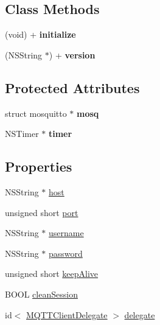 \subsection*{Class Methods}
\begin{DoxyCompactItemize}
\item 
\hypertarget{interface_m_q_t_t_client_addc8362ee9e927f944c604daf5f7e0c7}{(void) + {\bfseries initialize}}\label{interface_m_q_t_t_client_addc8362ee9e927f944c604daf5f7e0c7}

\item 
\hypertarget{interface_m_q_t_t_client_a28d3f42ae2595214b2c40794ca638c45}{(N\-S\-String $\ast$) + {\bfseries version}}\label{interface_m_q_t_t_client_a28d3f42ae2595214b2c40794ca638c45}

\end{DoxyCompactItemize}
\subsection*{Protected Attributes}
\begin{DoxyCompactItemize}
\item 
\hypertarget{interface_m_q_t_t_client_ae4f553d3d5b3f96833631fa71d089cae}{struct mosquitto $\ast$ {\bfseries mosq}}\label{interface_m_q_t_t_client_ae4f553d3d5b3f96833631fa71d089cae}

\item 
\hypertarget{interface_m_q_t_t_client_a947472d48ef128a407c579f3f03b6bb6}{N\-S\-Timer $\ast$ {\bfseries timer}}\label{interface_m_q_t_t_client_a947472d48ef128a407c579f3f03b6bb6}

\end{DoxyCompactItemize}
\subsection*{Properties}
\begin{DoxyCompactItemize}
\item 
N\-S\-String $\ast$ \hyperlink{interface_m_q_t_t_client_a1f617c2783f5f49fe0eade772b848330}{host}
\item 
unsigned short \hyperlink{interface_m_q_t_t_client_a1d5b24d0ebc1a18fa8cb85a48381513e}{port}
\item 
N\-S\-String $\ast$ \hyperlink{interface_m_q_t_t_client_aba20ca92199c2b75f3993468db429aed}{username}
\item 
N\-S\-String $\ast$ \hyperlink{interface_m_q_t_t_client_adb44dfa2630f0ac31524a0823c1f00f4}{password}
\item 
unsigned short \hyperlink{interface_m_q_t_t_client_a39d172ccd9c5f7c4d7927a547c496d6e}{keep\-Alive}
\item 
B\-O\-O\-L \hyperlink{interface_m_q_t_t_client_a097920820d62efef6d17060fbabf3b09}{clean\-Session}
\item 
id$<$ \hyperlink{protocol_m_q_t_t_client_delegate-p}{M\-Q\-T\-T\-Client\-Delegate} $>$ \hyperlink{interface_m_q_t_t_client_ae177aa16bf5c66e71db4c21820de7623}{delegate}
\end{DoxyCompactItemize}


